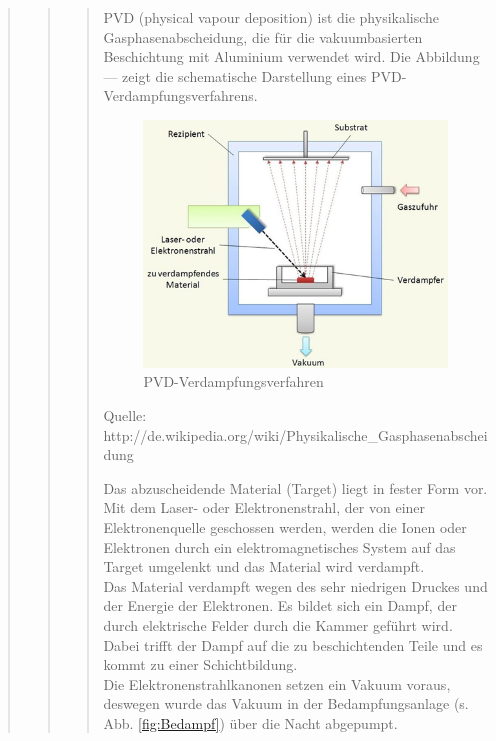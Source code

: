 \begin{quote}
\begin{quote}
\begin{quote}
 		PVD (physical vapour deposition) ist die physikalische 
 		Gasphasenabscheidung, die für die vakuumbasierten  Beschichtung mit 
 		Aluminium verwendet wird. Die Abbildung --- zeigt die schematische 
 		Darstellung eines PVD-Verdampfungsverfahrens.
 		
 		\vspace{2em}

    		\begin{figure}[H]
				\hspace{1.5 cm}
                  \includegraphics[scale=1, trim = 0cm 0cm 0cm 0cm,clip]
                	{./HerstellungBilder/SchematischeDarstellungeinesPVD-Verdampfungsverfahrens.png}
                  \caption{PVD-Verdampfungsverfahren}
                \label{fig:PVD}
            \end{figure}
            
    	\vspace{2em}
    	
    	Quelle: http://de.wikipedia.org/wiki/Physikalische_Gasphasenabscheidung
 		
 		Das abzuscheidende Material (Target) liegt in fester Form vor. Mit dem 
 		Laser- oder Elektronenstrahl, der von einer Elektronenquelle geschossen 
 		werden, werden die Ionen oder Elektronen durch ein elektromagnetisches 
 		System auf das Target umgelenkt und das Material wird verdampft.\\

		Das  Material verdampft  wegen des sehr niedrigen Druckes und der 
		Energie der Elektronen. Es bildet sich ein Dampf, der durch elektrische 
		Felder durch die Kammer geführt wird. Dabei trifft  der Dampf auf die zu 
		beschichtenden Teile und es kommt zu einer Schichtbildung.\\
		Die Elektronenstrahlkanonen setzen ein Vakuum voraus, deswegen wurde das 
		Vakuum in der Bedampfungsanlage (s. Abb. \ref{fig:Bedampf}) über die 
		Nacht abgepumpt.
 		

\end{quote}
\end{quote}
\end{quote}

